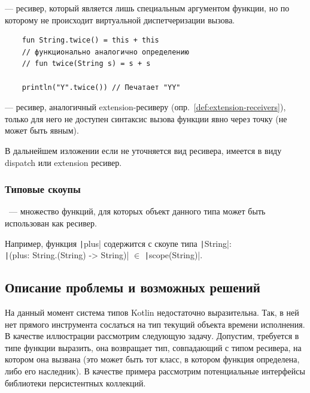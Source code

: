 \begin{definition}
    \label{def:extension-receivers}
     --- ресивер, который является лишь специальным аргументом функции, но по которому не происходит виртуальной диспетчеризации вызова.
\end{definition}

\begin{verbatim}
    fun String.twice() = this + this
    // функционально аналогично определению
    // fun twice(String s) = s + s

    println("Y".twice()) // Печатает "YY"
\end{verbatim}

\begin{definition}
    \label{def:context-receivers}
     --- ресивер, аналогичный extension-ресиверу (опр.~\ref{def:extension-receivers}), только для него не доступен синтаксис вызова функции явно через точку (не может быть явным).
\end{definition}

В дальнейшем изложении если не уточняется вид ресивера, имеется в виду dispatch или extension ресивер.

\subsubsection{Типовые скоупы}

\begin{definition}
    \label{def:type-scope}
    ~--- множество функций, для которых объект данного типа может быть использован как ресивер.
\end{definition}

Например, функция \texttt|plus| содержится с скоупе типа \texttt|String|: \\\texttt|(plus: String.(String) -> String)| $\in$ \texttt|scope(String)|.


\subsection{Описание проблемы и возможных решений}

На данный момент система типов Kotlin недостаточно выразительна.
Так, в ней нет прямого инструмента сослаться на тип текущий объекта времени исполнения.
В качестве иллюстрации рассмотрим следующую задачу.
Допустим, требуется в типе функции выразить, она возвращает тип, совпадающий с типом ресивера, на котором она вызвана (это может быть тот класс, в котором функция определена, либо его наследник).
В качестве примера рассмотрим потенциальные интерфейсы библиотеки персистентных коллекций.

